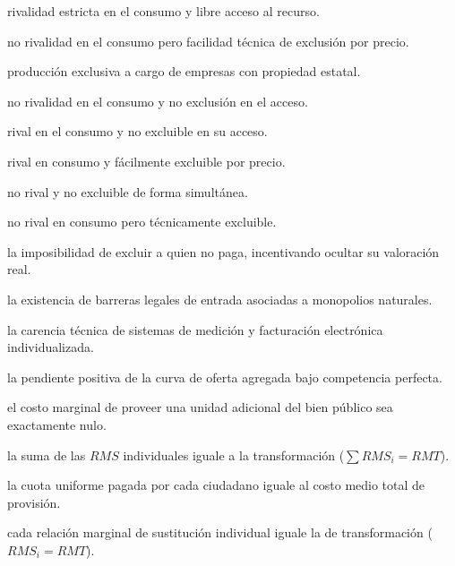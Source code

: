 \begin{opts}
    \item rivalidad estricta en el consumo y libre acceso al recurso.
    \item no rivalidad en el consumo pero facilidad técnica de exclusión por precio.
    \item producción exclusiva a cargo de empresas con propiedad estatal.
    \item no rivalidad en el consumo y no exclusión en el acceso.
\end{opts}

\begin{opts}
    \item rival en el consumo y no excluible en su acceso.
    \item rival en consumo y fácilmente excluible por precio.
    \item no rival y no excluible de forma simultánea.
    \item no rival en consumo pero técnicamente excluible.
\end{opts}

\begin{opts}
    \item la imposibilidad de excluir a quien no paga, incentivando ocultar su valoración real.
    \item la existencia de barreras legales de entrada asociadas a monopolios naturales.
    \item la carencia técnica de sistemas de medición y facturación electrónica individualizada.
    \item la pendiente positiva de la curva de oferta agregada bajo competencia perfecta.
\end{opts}

\begin{opts}
    \item el costo marginal de proveer una unidad adicional del bien público sea exactamente nulo.
    \item la suma de las $RMS$ individuales iguale a la transformación ($\sum RMS_i = RMT$).
    \item la cuota uniforme pagada por cada ciudadano iguale al costo medio total de provisión.
    \item cada relación marginal de sustitución individual iguale la de transformación ($RMS_i = RMT$).
\end{opts}

